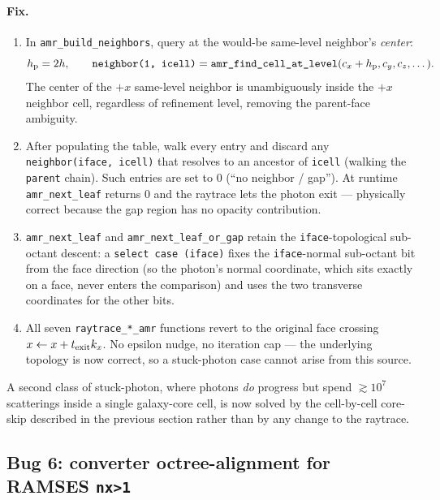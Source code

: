 \documentclass[english,a4paper]{my_memo}
\begin{document}
\paragraph{Fix.}
\begin{enumerate}
\item In \texttt{amr\_build\_neighbors}, query at the would-be same-level
neighbor's \emph{center}:
\[
  h_{\rm p} = 2 h,
  \qquad
  \texttt{neighbor(1, icell)} = \texttt{amr\_find\_cell\_at\_level}
  (c_x + h_{\rm p}, c_y, c_z, \dots).
\]
The center of the $+x$ same-level neighbor is unambiguously inside the
$+x$ neighbor cell, regardless of refinement level, removing the
parent-face ambiguity.

\item After populating the table, walk every entry and discard any
\texttt{neighbor(iface, icell)} that resolves to an ancestor of
\texttt{icell} (walking the \texttt{parent} chain).  Such entries are
set to $0$ (``no neighbor / gap'').  At runtime \texttt{amr\_next\_leaf}
returns $0$ and the raytrace lets the photon exit --- physically
correct because the gap region has no opacity contribution.

\item \texttt{amr\_next\_leaf} and \texttt{amr\_next\_leaf\_or\_gap}
retain the \texttt{iface}-topological sub-octant descent: a
\texttt{select case (iface)} fixes the \texttt{iface}-normal sub-octant
bit from the face direction (so the photon's normal coordinate, which
sits exactly on a face, never enters the comparison) and uses the two
transverse coordinates for the other bits.

\item All seven \texttt{raytrace\_*\_amr} functions revert to the
original face crossing $x \leftarrow x + t_{\rm exit} k_x$.  No
epsilon nudge, no iteration cap --- the underlying topology is now
correct, so a stuck-photon case cannot arise from this source.
\end{enumerate}

A second class of stuck-photon, where photons \emph{do} progress but
spend $\gtrsim 10^7$ scatterings inside a single galaxy-core cell, is
now solved by the cell-by-cell core-skip described in the previous section
rather than by any change to the raytrace.

\subsection{Bug 6: converter octree-alignment for RAMSES \texttt{nx>1}}
\end{document}
